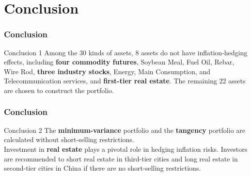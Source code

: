 \documentclass[
	11pt, %
]{beamer}
\begin{document}
\section{Conclusion}
\begin{frame}
\frametitle{Conclusion}
\begin{block}{Conclusion 1}
Among the 30 kinds of assets, 8 assets do not have inflation-hedging effects, including \textbf{four commodity futures}, Soybean Meal, Fuel Oil, Rebar, Wire Rod, \textbf{three industry stocks}, Energy, Main Consumption, and Telecommunication services, and \textbf{first-tier real estate}. The remaining 22 assets are chosen to construct the portfolio.
\end{block}
\end{frame}
\begin{frame}
\frametitle{Conclusion}
\begin{block}{Conclusion 2}
The \textbf{minimum-variance} portfolio and the \textbf{tangency} portfolio are calculated without short-selling restrictions. \\
\smallskip
Investment in \textbf{real estate} plays a pivotal role in hedging inflation risks. Investors are recommended to short real estate in third-tier cities and long real estate in second-tier cities in China if there are no short-selling restrictions.\\
\end{block}
\end{frame}
\end{document}
